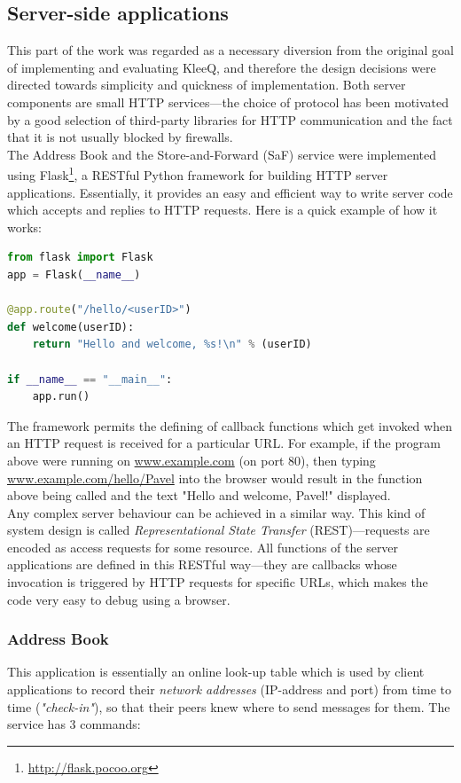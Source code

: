 \documentclass[a4paper, twoside, 12pt]{report}
\begin{document}
\subsection{Server-side applications}
\label{subsec:impl.prep.server}
This part of the work was regarded as a necessary diversion from the original goal of implementing and evaluating KleeQ, and therefore the design decisions were directed towards simplicity and quickness of implementation. Both server components are small HTTP services---the choice of protocol has been motivated by a good selection of third-party libraries for HTTP communication and the fact that it is not usually blocked by firewalls.\\

The Address Book and the Store-and-Forward (SaF) service were implemented using Flask\footnote{\url{http://flask.pocoo.org}}, a RESTful Python framework for building HTTP server applications. Essentially, it provides an easy and efficient way to write server code which accepts and replies to HTTP requests. Here is a quick example of how it works: 

\begin{lstlisting}[language = Python, columns=fullflexible]
from flask import Flask
app = Flask(__name__)

@app.route("/hello/<userID>")
def welcome(userID):
    return "Hello and welcome, %s!\n" % (userID)
    
if __name__ == "__main__":
    app.run()
\end{lstlisting}


The framework permits the defining of callback functions which get invoked when an HTTP request is received for a particular URL. For example, if the program above were running on \url{www.example.com} (on port 80), then typing \url{www.example.com/hello/Pavel} into the browser would result in the function above being called and the text "Hello and welcome, Pavel!" displayed. \\

Any complex server behaviour can be achieved in a similar way. This kind of system design is called \emph{Representational State Transfer} (REST)---requests are encoded as access requests for some resource.  All functions of the server applications are defined in this RESTful way---they are callbacks whose invocation is triggered by HTTP requests for specific URLs, which makes the code very easy to debug using a browser.

\subsubsection{Address Book}
This application is essentially an online look-up table which is used by client applications to record their \emph{network addresses} (IP-address and port) from time to time (\emph{"check-in"}), so that their peers knew where to send messages for them. The service has 3 commands:
\end{document}
